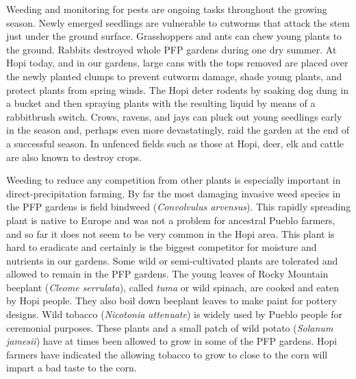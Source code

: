 \documentclass[12pt,]{article}
\begin{document}
Weeding and monitoring for pests are ongoing tasks throughout the growing season. Newly emerged seedlings are vulnerable to cutworms that attack the stem just under the ground surface. Grasshoppers and ants can chew young plants to the ground. Rabbits destroyed whole PFP gardens during one dry summer. At Hopi today, and in our gardens, large cans with the tops removed are placed over the newly planted clumps to prevent cutworm damage, shade young plants, and protect plants from spring winds. The Hopi deter rodents by soaking dog dung in a bucket and then spraying plants with the resulting liquid by means of a rabbitbrush switch. Crows, ravens, and jays can pluck out young seedlings early in the season and, perhaps even more devastatingly, raid the garden at the end of a successful season. In unfenced fields such as those at Hopi, deer, elk and cattle are also known to destroy crops.

Weeding to reduce any competition from other plants is especially important in direct-precipitation farming. By far the most damaging invasive weed species in the PFP gardens is field bindweed (\emph{Convolvulus arvensus}). This rapidly spreading plant is native to Europe and was not a problem for ancestral Pueblo farmers, and so far it does not seem to be very common in the Hopi area. This plant is hard to eradicate and certainly is the biggest competitor for moisture and nutrients in our gardens. Some wild or semi-cultivated plants are tolerated and allowed to remain in the PFP gardens. The young leaves of Rocky Mountain beeplant (\emph{Cleome serrulata}), called \emph{tuma} or wild spinach, are cooked and eaten by Hopi people. They also boil down beeplant leaves to make paint for pottery designs. Wild tobacco (\emph{Nicotonia attenuate}) is widely used by Pueblo people for ceremonial purposes. These plants and a small patch of wild potato (\emph{Solanum jamesii}) have at times been allowed to grow in some of the PFP gardens. Hopi farmers have indicated the allowing tobacco to grow to close to the corn will impart a bad taste to the corn.
\end{document}
